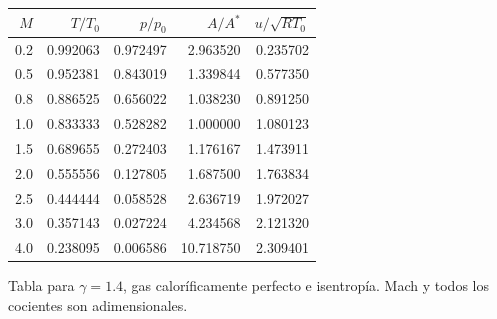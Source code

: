 \begin{center}\begin{tabular}{rrrrr}\toprule $M$&$T/T_0$&$p/p_0$&$A/A^*$&$u/\sqrt{RT_0}$\\\midrule
0.2 & 0.992063 & 0.972497 & 2.963520 & 0.235702\\
0.5 & 0.952381 & 0.843019 & 1.339844 & 0.577350\\
0.8 & 0.886525 & 0.656022 & 1.038230 & 0.891250\\
1.0 & 0.833333 & 0.528282 & 1.000000 & 1.080123\\
1.5 & 0.689655 & 0.272403 & 1.176167 & 1.473911\\
2.0 & 0.555556 & 0.127805 & 1.687500 & 1.763834\\
2.5 & 0.444444 & 0.058528 & 2.636719 & 1.972027\\
3.0 & 0.357143 & 0.027224 & 4.234568 & 2.121320\\
4.0 & 0.238095 & 0.006586 & 10.718750 & 2.309401\\
\bottomrule\end{tabular}\end{center} Tabla para $\gamma=1.4$, gas caloríficamente perfecto e isentropía. Mach y todos los cocientes son adimensionales.